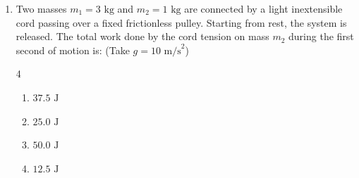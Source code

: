 \documentclass[11pt,a4paper]{article}
\begin{document}
\begin{enumerate}[label=\textbf{\arabic*.},leftmargin=18pt,itemsep=8pt,resume]
  \item Two masses $m_1 = 3\text{ kg}$ and $m_2 = 1\text{ kg}$ are connected by a light inextensible cord passing over a fixed frictionless pulley. Starting from rest, the system is released. The total work done by the cord tension on mass $m_2$ during the first second of motion is: (Take $g = 10\text{ m/s}^2$)
  \begin{multicols}{4}
    \begin{enumerate}[label=(\Alph*)]
      \item $37.5\text{ J}$
      \item $25.0\text{ J}$
      \item $50.0\text{ J}$
      \item $12.5\text{ J}$
    \end{enumerate}
  \end{multicols}

\end{enumerate}

\vspace{8pt}
\noindent{\textbf{\textsf{\textcolor{l3Crimson}{Section B: High-Yield JEE Integer Numericals (Q70 -- Q75)}}}}
\vspace{2pt}
\end{document}
